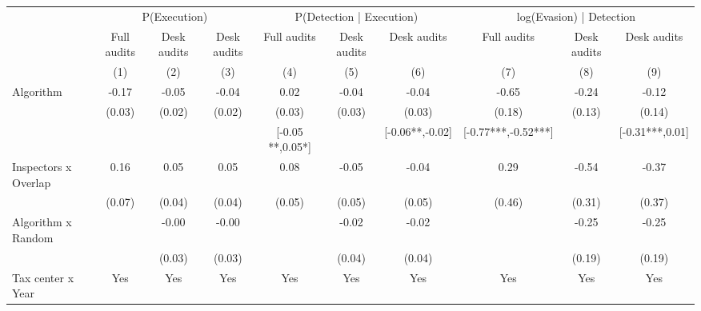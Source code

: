 \begin{tabular}{lccc|ccc|ccc} \toprule
\multicolumn{1}{l}{} & \multicolumn{3}{c}{P(Execution)} & \multicolumn{3}{c}{P(Detection | Execution)} & \multicolumn{3}{c}{log(Evasion) | Detection} \\\cmidrule(lr){2-4}\cmidrule(lr){5-7}\cmidrule(lr){8-10} \multicolumn{1}{l}{} & Full audits & Desk audits & Desk audits & Full audits & Desk audits & Desk audits & Full audits & Desk audits & Desk audits \\ \multicolumn{1}{l}{} & (1) & (2) & (3) & (4) & (5) & (6) & (7) & (8) & (9) \\ \midrule
Algorithm   &       -0.17\sym{***}&       -0.05\sym{**} &       -0.04\sym{**} &        0.02         &       -0.04         &       -0.04         &       -0.65\sym{***}&       -0.24\sym{*}  &       -0.12         \\
            &      (0.03)         &      (0.02)         &      (0.02)         &      (0.03)         &      (0.03)         &      (0.03)         &      (0.18)         &      (0.13)         &      (0.14)         \\
\addlinespace
 & & & & [-0.05 **,0.05*] & & [-0.06**,-0.02] & [-0.77***,-0.52***] & & [-0.31***,0.01] \\  Inspectors x Overlap&        0.16\sym{**} &        0.05         &        0.05         &        0.08         &       -0.05         &       -0.04         &        0.29         &       -0.54\sym{*}  &       -0.37         \\
            &      (0.07)         &      (0.04)         &      (0.04)         &      (0.05)         &      (0.05)         &      (0.05)         &      (0.46)         &      (0.31)         &      (0.37)         \\
\addlinespace
Algorithm x Random&                     &       -0.00         &       -0.00         &                     &       -0.02         &       -0.02         &                     &       -0.25         &       -0.25         \\
            &                     &      (0.03)         &      (0.03)         &                     &      (0.04)         &      (0.04)         &                     &      (0.19)         &      (0.19)         \\
\midrule
Tax center x Year&         Yes         &         Yes         &         Yes         &         Yes         &         Yes         &         Yes         &         Yes         &         Yes         &         Yes         \\

\end{tabular}
